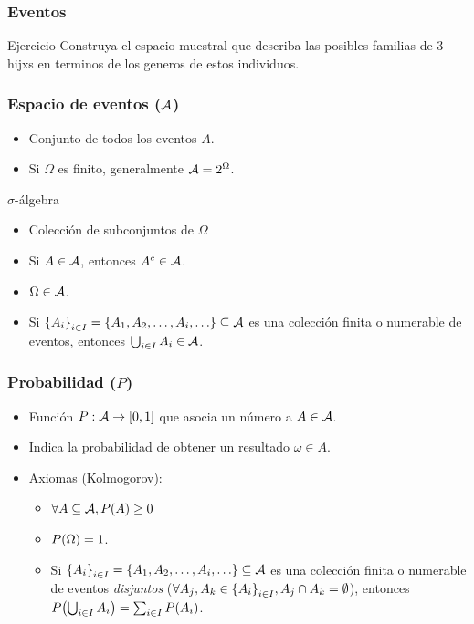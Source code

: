 \documentclass[table]{beamer}
\begin{document}
\begin{frame}
    \frametitle{Eventos}

    \begin{block}{Ejercicio}
Construya el espacio muestral que describa  las posibles familias de 3 hijxs en terminos de los generos de estos individuos.

\end{block}

\end{frame}


\begin{frame}
    \frametitle{Espacio de eventos ($\mathcal{A}$)}
        \begin{itemize}
            \item Conjunto de todos los eventos $A$.
            \item Si $\Omega$ es finito, generalmente $\mathcal{A} = 2^{\Omega}$.
        \end{itemize}
   \begin{block}{$\sigma$-álgebra}
        \begin{itemize}
				\item Colección de subconjuntos de $\Omega$
            \item Si $A \in \mathcal{A}$, entonces $A^{c} \in \mathcal{A}$.
            \item $\Omega \in \mathcal{A}$.
            \item Si $\bparens{A_{i}}_{i \in I} = \bparens{A_{1}, A_{2}, \ldots, A_{i}, \ldots} \subseteq \eventspace$ es una colección finita o numerable de eventos, entonces $\bigcup_{i \in I} A_{i} \in \mathcal{A}$.
        \end{itemize}
    \end{block}
\end{frame}

\begin{frame}
    \frametitle{Probabilidad ($P$)}
       \begin{itemize}
            \item Función $P: \eventspace \rightarrow \sparens{0, 1}$ que asocia un número a $A \in \mathcal{A}$.
            \item Indica la probabilidad de obtener un resultado $\omega \in A$.
            \item Axiomas (Kolmogorov):
                \begin{itemize}
                    \item $\forall A \subseteq \eventspace, \prob{A} \geq 0$
                    \item $\prob{\Omega} = 1$.
                    \item Si $\bparens{A_{i}}_{i \in I} = \bparens{A_{1}, A_{2}, \ldots, A_{i}, \ldots} \subseteq \eventspace$ es una colección finita o numerable de eventos \emph{disjuntos} ($\forall A_{j}, A_{k} \in \bparens{A_{i}}_{i \in I}, A_{j} \cap A_{k} = \emptyset$), entonces $\prob{\bigcup_{i \in I} A_{i}} = \sum_{i \in I} \prob{A_{i}}$.
                \end{itemize}
        \end{itemize}

\end{frame}
\end{document}
